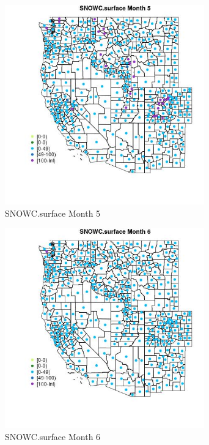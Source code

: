 \begin{figure} 
\centering  
\includegraphics[width=0.77\textwidth]{Code_Outputs/df_report_ML_predictors_CountyCentroid_Locations_Dates_2008-01-01to2018-12-31_MapObsMo5SNOWCsurface.jpg} 
\caption{\label{fig:df_report_ML_predictors_CountyCentroid_Locations_Dates_2008-01-01to2018-12-31MapObsMo5SNOWCsurface}SNOWC.surface Month 5} 
\end{figure} 
 

\clearpage 

\begin{figure} 
\centering  
\includegraphics[width=0.77\textwidth]{Code_Outputs/df_report_ML_predictors_CountyCentroid_Locations_Dates_2008-01-01to2018-12-31_MapObsMo6SNOWCsurface.jpg} 
\caption{\label{fig:df_report_ML_predictors_CountyCentroid_Locations_Dates_2008-01-01to2018-12-31MapObsMo6SNOWCsurface}SNOWC.surface Month 6} 
\end{figure} 
 


